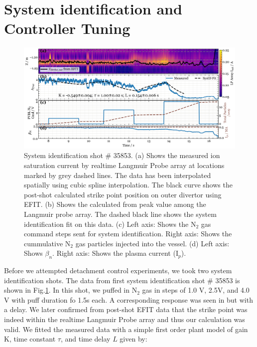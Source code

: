 \section{System identification and Controller Tuning}
\label{sec:sysid}





\begin{figure}[!ht]
 \centering
 \includegraphics[width=\textwidth]{figures/DetCtrl_2D_35853.pdf}
 \caption{System identification shot \# 35853. (a) Shows the measured ion saturation current by realtime Langmuir Probe array at locations marked by grey dashed lines. The data has been interpolated spatially using cubic spline interpolation. The black curve shows the post-shot calculated strike point position on outer divertor using EFIT. (b) Shows the \Afrac calculated from peak value among the Langmuir probe array. The dashed black line shows the system identification fit on this data. (c) Left axis: Shows the N$_2$ gas command steps sent for system identification. Right axis: Shows the cummulative N$_2$ gas particles injected into the vessel. (d) Left axis: Shows $\beta_n$. Right axis: Shows the plasma current (I$_p$).}
 \label{fig:sysid_afrac}
\end{figure}

Before we attempted detachment control experiments, we took two system identification shots. The data from first system identification shot \# 35853 is shown in Fig.\ref{fig:sysid_afrac}. In this shot, we puffed in N$_2$ gas in steps of 1.0 V, 2.5V, and 4.0 V with puff duration fo 1.5s each. A corresponding response was seen in \Afrac but with a delay. We later confirmed from post-shot EFIT data that the strike point was indeed within the realtime Langmuir Probe array and thus our \Afrac calculation was valid. We fitted the measured data with a simple first order plant model of gain K, time constant $\tau$, and time delay $L$ given by:

